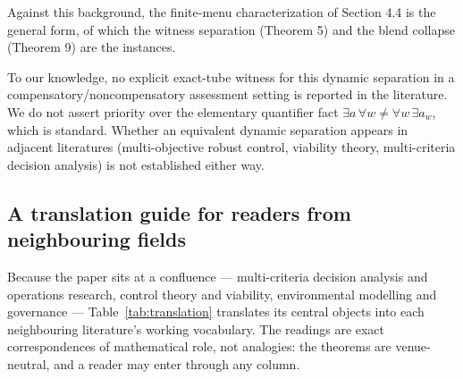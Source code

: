 \documentclass[3p,11pt]{elsarticle}
\begin{document}
Against this background, the finite-menu characterization of
Section 4.4 is the general form, of which the witness separation
(Theorem 5) and the blend collapse (Theorem 9) are the instances.

To our knowledge, no explicit exact-tube witness for this dynamic
separation in a compensatory/noncompensatory assessment setting is
reported in the literature. We do not assert priority over the
elementary quantifier fact
\(\exists a\, \forall w \neq \forall w\, \exists a_w\), which is
standard. Whether an equivalent dynamic separation appears in adjacent
literatures (multi-objective robust control, viability theory,
multi-criteria decision analysis) is not established either way.

\subsection{A translation guide for readers from neighbouring
fields}\label{translation-guide}

Because the paper sits at a confluence --- multi-criteria decision analysis
and operations research, control theory and viability, environmental
modelling and governance --- Table~\ref{tab:translation} translates its
central objects into each neighbouring literature's working vocabulary. The
readings are exact correspondences of mathematical role, not analogies: the
theorems are venue-neutral, and a reader may enter through any column.
\end{document}
